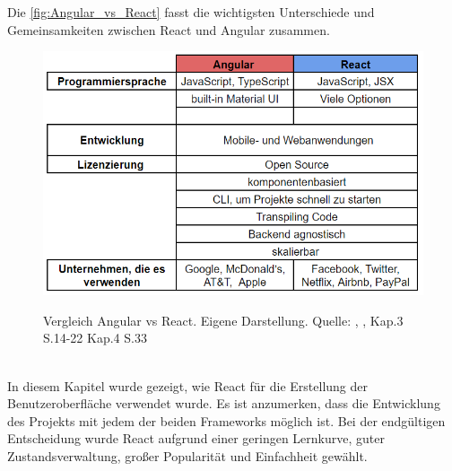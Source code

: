 \newpage
Die \autoref{fig:Angular_vs_React} fasst die wichtigsten Unterschiede und Gemeinsamkeiten zwischen React und Angular zusammen.
\\
  \begin{figure}[h!]
    \centering
    \includegraphics[scale=0.5]{sources/Angular_vs_React}
    \caption[Vergleich Angular vs React]{}
    \label{fig:Angular_vs_React} 
    Vergleich Angular vs React. Eigene Darstellung. Quelle:
    \cite{AvsR}, {, Kap.3 S.14-22 Kap.4 S.33\cite{E01}}
  \end{figure}
\\
   In diesem Kapitel wurde gezeigt, wie React für die Erstellung der Benutzeroberfläche verwendet wurde. Es ist anzumerken, dass die Entwicklung des Projekts mit jedem der beiden Frameworks möglich ist. Bei der endgültigen Entscheidung wurde React aufgrund einer geringen Lernkurve, guter Zustandsverwaltung, großer Popularität und Einfachheit gewählt.
